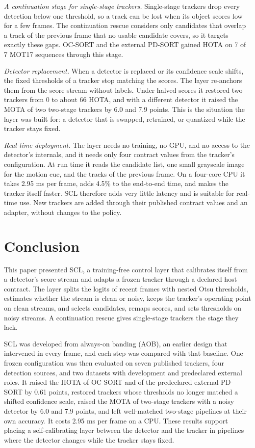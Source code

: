 \documentclass[pdflatex,sn-mathphys-num,iicol]{sn-jnl}
\newcommand{\scl}{SCL}
\newcommand{\aob}{AOB}
\begin{document}
\emph{A continuation stage for single-stage trackers.} Single-stage trackers
drop every detection below one threshold, so a track can be lost when its
object scores low for a few frames. The continuation rescue considers only
candidates that overlap a track of the previous frame that no usable candidate
covers, so it targets exactly these gaps. OC-SORT and the external PD-SORT
gained HOTA on 7 of 7 MOT17 sequences through this stage.

\emph{Detector replacement.} When a detector is replaced or its confidence
scale shifts, the fixed thresholds of a tracker stop matching the scores. The
layer re-anchors them from the score stream without labels. Under halved
scores it restored two trackers from 0 to about 66 HOTA, and with a different
detector it raised the MOTA of two two-stage trackers by 6.0 and 7.9 points.
This is the situation the layer was built for: a detector that is swapped,
retrained, or quantized while the tracker stays fixed.

\emph{Real-time deployment.} The layer needs no training, no GPU, and no
access to the detector's internals, and it needs only four contract values
from the tracker's configuration. At run time it reads the candidate list, one
small grayscale image for the motion cue, and the tracks of the previous
frame. On a four-core CPU it takes 2.95 ms per frame, adds 4.5\% to the end-to-end time, and makes the tracker
itself faster. \scl{} therefore adds very little latency and is
suitable for real-time use. New trackers are added through their published
contract values and an adapter, without changes to the policy.
\section{Conclusion}\label{sec:conclusion}

This paper presented \scl{}, a training-free control layer that calibrates itself
from a detector's score stream and adapts a frozen tracker through a declared
host contract. The layer splits the logits of recent frames with nested Otsu
thresholds, estimates whether the stream is clean or noisy, keeps the
tracker's operating point on clean streams, and selects candidates, remaps
scores, and sets thresholds on noisy streams. A continuation rescue gives
single-stage trackers the stage they lack.

\scl{} was developed from always-on banding (\aob{}), an earlier design that
intervened in every frame, and each step was compared with that baseline.
One frozen configuration was then evaluated on seven published trackers, four
detection sources, and two datasets with development and predeclared
external roles. It raised the HOTA of
OC-SORT and of the predeclared external PD-SORT by 0.61 points, restored
trackers whose thresholds no longer matched a shifted confidence scale, raised
the MOTA of two-stage trackers with a noisy detector by 6.0 and 7.9 points,
and left well-matched two-stage pipelines at their own accuracy. It costs
2.95 ms per frame on a CPU. These results support placing a self-calibrating
layer between the detector and the tracker in pipelines where the detector
changes while the tracker stays fixed.
\end{document}
